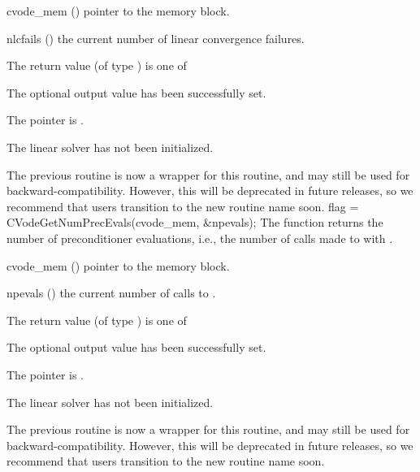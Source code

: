 {
  \begin{args}
  \item[cvode\_mem] ()
    pointer to the {\cvode} memory block.
  \item[nlcfails] ()
    the current number of linear convergence failures.
  \end{args}
}
{
  The return value  (of type ) is one of
  \begin{args}
  \item[\Id{CVLS\_SUCCESS}]
    The optional output value has been successfully set.
  \item[\Id{CVLS\_MEM\_NULL}]
    The  pointer is .
  \item[\Id{CVLS\_LMEM\_NULL}]
    The {\cvls} linear solver has not been initialized.
  \end{args}
}
{
  The previous routine  is now a wrapper for
  this routine, and may still be used for backward-compatibility.
  However, this will be deprecated in future releases, so we recommend
  that users transition to the new routine name soon.
}
{
  flag = CVodeGetNumPrecEvals(cvode\_mem, \&npevals);
}
{
  The function  returns the
  number of preconditioner evaluations, i.e., the number of
  calls made to  with .
}
{
  \begin{args}
  \item[cvode\_mem] ()
    pointer to the {\cvode} memory block.
  \item[npevals] ()
    the current number of calls to .
  \end{args}
}
{
  The return value  (of type ) is one of
  \begin{args}
  \item[\Id{CVLS\_SUCCESS}]
    The optional output value has been successfully set.
  \item[\Id{CVLS\_MEM\_NULL}]
    The  pointer is .
  \item[\Id{CVLS\_LMEM\_NULL}]
    The {\cvls} linear solver has not been initialized.
  \end{args}
}
{
  The previous routine  is now a wrapper for
  this routine, and may still be used for backward-compatibility.
  However, this will be deprecated in future releases, so we recommend
  that users transition to the new routine name soon.
}
